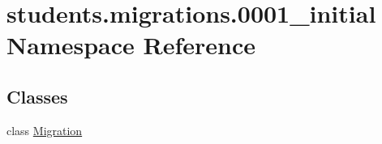 \hypertarget{namespacestudents_1_1migrations_1_10001__initial}{\section{students.\-migrations.0001\-\_\-initial Namespace Reference}
\label{namespacestudents_1_1migrations_1_10001__initial}
}
\subsection*{Classes}
\begin{DoxyCompactItemize}
\item 
class \hyperlink{classstudents_1_1migrations_1_10001__initial_1_1_migration}{Migration}
\end{DoxyCompactItemize}
